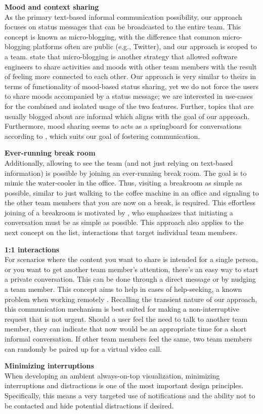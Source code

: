 \medskip\noindent\textbf{Mood and context sharing} \\
As the primary text-based informal communication possibility, our approach focuses on status messages that can be broadcasted to the entire team. This concept is known as micro-blogging, with the difference that common micro-blogging platforms often are public (e.g., Twitter), and our approach is scoped to a team. \textcite{dullemond2013fixing} state that micro-blogging is another strategy that allowed software engineers to share activities and moods with other team members with the result of feeling more connected to each other. Our approach is very similar to theirs in terms of functionality of mood-based status sharing, yet we do not force the users to share moods accompanied by a status message; we are interested in use-cases for the combined and isolated usage of the two features. Further, topics that are usually blogged about are informal \autocite{ehrlich2010microblogging} which aligns with the goal of our approach. Furthermore, mood sharing seems to acts as a springboard for conversations according to \textcite{church2010study}, which suits our goal of fostering communication.

\medskip\noindent\textbf{Ever-running break room} \\
Additionally, allowing to see the team (and not just relying on text-based information) is possible by joining an ever-running break room. The goal is to mimic the water-cooler in the office. Thus, visiting a breakroom as simple as possible, similar to just walking to the coffee machine in an office and signaling to the other team members that you are now on a break, is required. This effortless joining of a breakroom is motivated by \textcite{chang2007out}, who emphasizes that initiating a conversation must be as simple as possible. This approach also applies to the next concept on the list, interactions that target individual team members.

\medskip\noindent\textbf{1:1 interactions} \\
For scenarios where the content you want to share is intended for a single person, or you want to get another team member's attention, there's an easy way to start a private conversation. This can be done through a direct message or by nudging a team member. This concept aims to help in cases of help-seeking, a known problem when working remotely \autocite{herbsleb2003empirical}. Recalling the transient nature of our approach, this communication mechanism is best suited for making a non-interruptive request that is not urgent. Should a user feel the need to talk to another team member, they can indicate that now would be an appropriate time for a short informal conversation. If other team members feel the same, two team members can randomly be paired up for a virtual video call.

\medskip\noindent\textbf{Minimizing interruptions} \\
When developing an ambient always-on-top visualization, minimizing interruptions and distractions is one of the most important design principles. Specifically, this means a very targeted use of notifications and the ability not to be contacted and hide potential distractions if desired.
